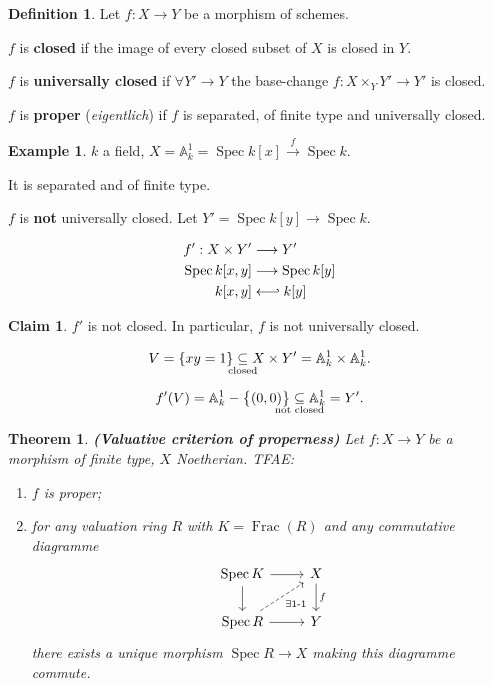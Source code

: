 \documentclass[12pt]{article}
\DeclareMathOperator{\Spec}{Spec}
\DeclareMathOperator{\Frac}{Frac}
\newtheorem*{theorem}{Theorem}
\theoremstyle{definition}
\newtheorem*{definition}{Definition}
\newtheorem*{claim}{Claim}
\newtheorem*{example}{Example}
\begin{document}
\begin{definition}
Let $f:X\rightarrow Y$ be a morphism of schemes.

$f$ is \textbf{closed} if the image of every closed subset of $X$ is closed in $Y$.

$f$ is \textbf{universally closed} if $\forall Y'\rightarrow Y$ the base-change $f:X\times_YY'\rightarrow Y'$ is closed.

$f$ is \textbf{proper} (\emph{eigentlich}) if $f$ is separated, of finite type and universally closed.
\end{definition}

\begin{example}
$k$ a field, $X=\mathbb A_k^1=\Spec k[x]\xrightarrow f\Spec k$.

It is separated and of finite type.

$f$ is \textbf{not} universally closed. Let $Y'=\Spec k[y]\rightarrow\Spec k$.

\begin{align*}
f':X\times Y'&\longrightarrow Y'\\\Spec k[x,y]&\longrightarrow\Spec k[y]\\k[x,y]&\longleftarrow\joinrel\rhook k[y]
\end{align*}

\begin{claim}
$f'$ is not closed. In particular, $f$ is not universally closed.
\end{claim}

\[V=\{xy=1\}\underset{\mathclap{\text{closed}}}\subseteq X\times Y'=\mathbb A_k^1\times\mathbb A_k^1.\]

\[f'(V)=\mathbb A_k^1-\big\{(0,0)\big\}\underset{\mathclap{\text{not closed}}}\subseteq\mathbb A_k^1=Y'.\]
\end{example}

\begin{theorem}
\emph{\textbf{(Valuative criterion of properness)}} Let $f:X\rightarrow Y$ be a morphism of finite type, $X$ Noetherian. TFAE:
\begin{enumerate}[label=\arabic*)]
\item $f$ is proper;
\item for any valuation ring $R$ with $K=\Frac(R)$ and any commutative diagramme
\[\begin{tikzcd}\Spec K\arrow[r]\arrow[d]&X\arrow[d,"f"]\\\Spec R\arrow[r]\arrow[ru,dashed,"\exists1\text-1",swap]&Y\end{tikzcd}\]
there exists a unique morphism $\Spec R\rightarrow X$ making this diagramme commute.
\end{enumerate}
\end{theorem}
\end{document}
